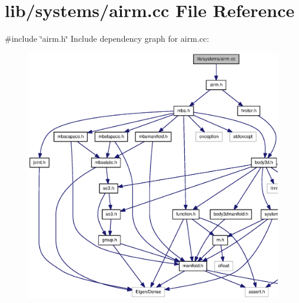 \section{lib/systems/airm.cc \-File \-Reference}
\label{airm_8cc}
{\ttfamily \#include \char`\"{}airm.\-h\char`\"{}}\*
\-Include dependency graph for airm.\-cc\-:\nopagebreak
\begin{figure}[H]
\begin{center}
\leavevmode
\includegraphics[width=350pt]{airm_8cc__incl}
\end{center}
\end{figure}
